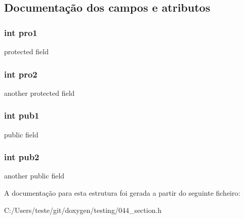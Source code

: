 \subsection{Documentação dos campos e atributos}
\hypertarget{struct_s_a394658f59b1cb9d5e9158c312e210532}{
\subsubsection[{pro1}]{\setlength{\rightskip}{0pt plus 5cm}int pro1\hspace{0.3cm}{\ttfamily [protected]}}}\label{struct_s_a394658f59b1cb9d5e9158c312e210532}
protected field \hypertarget{struct_s_a3ab99355e034010613141b073a2df4f7}{
\subsubsection[{pro2}]{\setlength{\rightskip}{0pt plus 5cm}int pro2\hspace{0.3cm}{\ttfamily [protected]}}}\label{struct_s_a3ab99355e034010613141b073a2df4f7}
another protected field \hypertarget{struct_s_a63c832f7fdd645269844bbf5884007a5}{
\subsubsection[{pub1}]{\setlength{\rightskip}{0pt plus 5cm}int pub1}}\label{struct_s_a63c832f7fdd645269844bbf5884007a5}
public field \hypertarget{struct_s_ae98aef14581b4ec23c3d455a057f508c}{
\subsubsection[{pub2}]{\setlength{\rightskip}{0pt plus 5cm}int pub2}}\label{struct_s_ae98aef14581b4ec23c3d455a057f508c}
another public field 

A documentação para esta estrutura foi gerada a partir do seguinte ficheiro\-:\begin{DoxyCompactItemize}
\item 
C\-:/\-Users/teste/git/doxygen/testing/044\-\_\-section.\-h\end{DoxyCompactItemize}
